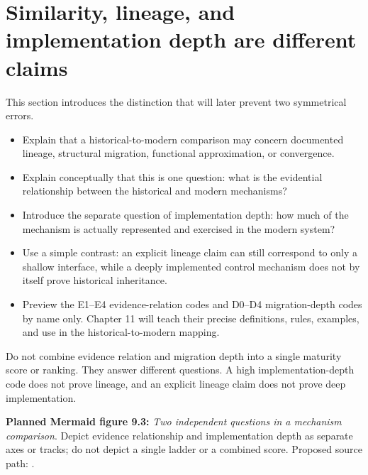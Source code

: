 \section{Similarity, lineage, and implementation depth are different claims}
This section introduces the distinction that will later prevent two symmetrical errors.
\begin{itemize}
  \item Explain that a historical-to-modern comparison may concern documented lineage, structural migration, functional approximation, or convergence.
  \item Explain conceptually that this is one question: what is the evidential relationship between the historical and modern mechanisms?
  \item Introduce the separate question of implementation depth: how much of the mechanism is actually represented and exercised in the modern system?
  \item Use a simple contrast: an explicit lineage claim can still correspond to only a shallow interface, while a deeply implemented control mechanism does not by itself prove historical inheritance.
  \item Preview the E1--E4 evidence-relation codes and D0--D4 migration-depth codes by name only. Chapter 11 will teach their precise definitions, rules, examples, and use in the historical-to-modern mapping.
\end{itemize}
\begin{warningbox}
Do not combine evidence relation and migration depth into a single maturity score or ranking. They answer different questions. A high implementation-depth code does not prove lineage, and an explicit lineage claim does not prove deep implementation.
\end{warningbox}
\textbf{Planned Mermaid figure 9.3:} \emph{Two independent questions in a mechanism comparison}. Depict evidence relationship and implementation depth as separate axes or tracks; do not depict a single ladder or a combined score. Proposed source path: .

